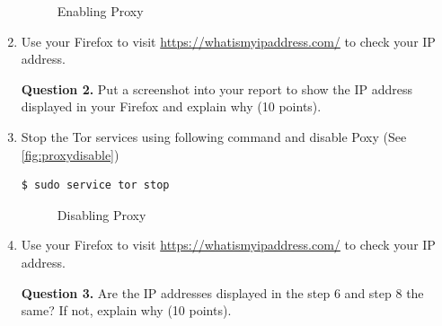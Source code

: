 \documentclass[11pt]{article}
\newcommand{\tor}{{\sf Tor}\xspace}
\begin{document}
\begin{enumerate}
\begin{figure}[h]
\centering
{}
\caption{Enabling Proxy}\label{fig:proxyenable}
\end{figure}

\item Use your \textsf{Firefox} to visit \url{https://whatismyipaddress.com/} to check your IP address.  

\textbf{Question 2.} Put a screenshot into your report to show the IP address displayed in your \textsf{Firefox} and explain why (10 points).

\item Stop the \tor services using following command and disable Poxy (See \autoref{fig:proxydisable})
 \begin{lstlisting}
$ sudo service tor stop
\end{lstlisting}\vspace{-6mm}

\begin{figure}[h]
\centering
{}
\caption{Disabling Proxy}\label{fig:proxydisable}
\end{figure}

\item Use your \textsf{Firefox} to visit \url{https://whatismyipaddress.com/} to check your IP address.

\textbf{Question 3.}  Are the IP addresses displayed in the step 6 and step 8 the same? If not, explain why (10 points). 

\end{enumerate}
\end{document}
